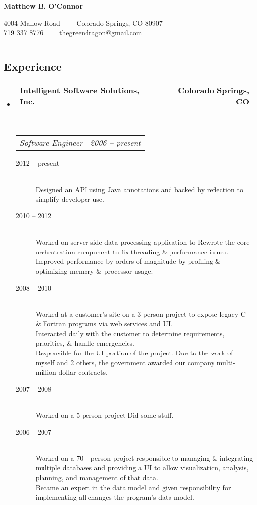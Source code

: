 \documentclass[10pt,letterpaper]{article}
\makeatletter
\newcommand{\headerrow}[2]
{\begin{tabular*}{\linewidth}{l@{\extracolsep{\fill}}r}
	#1 &
	#2 \\
\end{tabular*}}
\makeatother
\begin{document}
\begin{center}
{\LARGE \textbf{Matthew B. O'Connor}}

4004 Mallow Road\ \ \textbullet
\ \ Colorado Springs, CO 80907
\\
719 337 8776\ \ \textbullet
\ \ thegreendragon@gmail.com
\end{center}

\hrule
\vspace{-0.4em}
\subsection*{Experience}

\begin{itemize}
	\parskip=0.1em

	\item
	\headerrow
		{\textbf{Intelligent Software Solutions, Inc.}}
		{\textbf{Colorado Springs, CO}}
	\\
	\headerrow
		{\emph{Software Engineer}}
		{\emph{2006 -- present}}
	\begin{description}
		\item[2012 -- present] \hfill \\ %
				Designed an API using Java annotations and backed by reflection to simplify developer use.
		\item[2010 -- 2012] \hfill \\ %
				Worked on server-side data processing application to
				Rewrote the core orchestration component to fix threading \& performance issues. \\
				Improved performance by orders of magnitude by profiling \& optimizing memory \& processor usage.
		\item[2008 -- 2010] \hfill \\ %
				Worked at a customer's site on a 3-person project to expose legacy C \& Fortran programs via web services and UI. \\
				Interacted daily with the customer to determine requirements, priorities, \& handle emergencies. \\
				Responsible for the UI portion of the project.
				Due to the work of myself and 2 others, the government awarded our company multi-million dollar contracts.
		\item[2007 -- 2008] \hfill \\ %
				Worked on a 5 person project
				Did some stuff.
		\item[2006 -- 2007] \hfill \\ %
				Worked on a 70+ person project responsible to managing \& integrating multiple databases and providing a UI to allow visualization, analysis, planning, and management of that data. \\
				Became an expert in the data model and given responsibility for implementing all changes the program's data model.
	\end{description}


\end{itemize}
\end{document}
